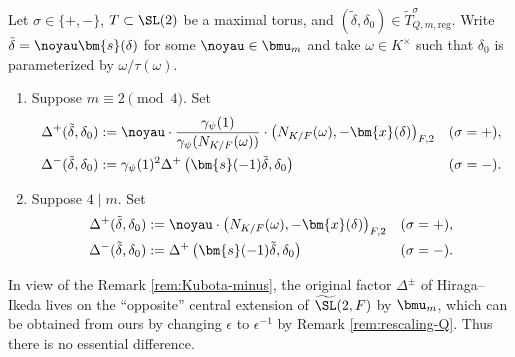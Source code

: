 \documentclass[a4paper,10pt]{article}
\begin{document}
\begin{definition}
	Let $\sigma \in \{+,-\}$, $T \subset \SL(2)$ be a maximal torus, and $(\tilde{\delta}, \delta_0) \in \tilde{T}^\sigma_{Q,m, \text{reg}}$. Write $\tilde{\delta} = \noyau\bm{s}(\delta)$ for some $\noyau \in \bmu_m$ and take $\omega \in K^\times$ such that $\delta_0$ is parameterized by $\omega/\tau(\omega)$.
	\begin{enumerate}
		\item Suppose $m \equiv 2 \pmod 4$. Set
			\begin{align*}
				\Delta^+(\tilde{\delta}, \delta_0) & := \noyau \cdot \dfrac{\gamma_\psi(1)}{\gamma_\psi(N_{K/F}(\omega))} \cdot \left( N_{K/F}(\omega), -\bm{x}(\delta) \right)_{F,2} & (\sigma = +), \\
				\Delta^-(\tilde{\delta}, \delta_0) & := \gamma_\psi(1)^2 \Delta^+ \left( \bm{s}(-1)\tilde{\delta} , \delta_0 \right) & (\sigma = -).
			\end{align*}
		\item Suppose $4 \mid m$. Set
			\begin{align*}
				\Delta^+(\tilde{\delta}, \delta_0) & := \noyau \cdot \left( N_{K/F}(\omega), -\bm{x}(\delta) \right)_{F,2} & (\sigma = +), \\
				\Delta^-(\tilde{\delta}, \delta_0) & := \Delta^+ \left( \bm{s}(-1)\tilde{\delta} , \delta_0 \right) & (\sigma = -).
			\end{align*}
	\end{enumerate}
\end{definition}

\begin{remark}
	In view of the Remark \ref{rem:Kubota-minus}, the original factor $\Delta^\pm$ of Hiraga--Ikeda lives on the ``opposite'' central extension of $\widetilde{\SL}(2,F)$ by $\bmu_m$, which can be obtained from ours by changing $\epsilon$ to $\epsilon^{-1}$ by Remark \ref{rem:rescaling-Q}. Thus there is no essential difference.
\end{remark}
\end{document}

